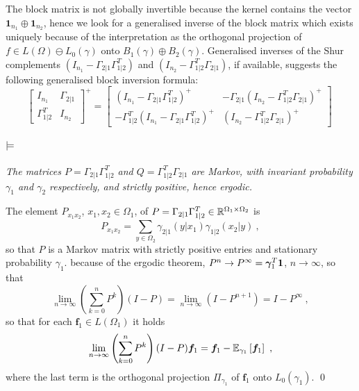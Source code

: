 \documentclass[runningheads]{llncs}
\begin{document}
The block matrix is not globally invertible because the kernel contains the vector $\bm 1 _{n_1} \oplus \bm 1_{n_2}$, hence we look for a generalised inverse of the block matrix  which  exists uniquely because of the interpretation as the orthogonal projection of $f \in L(\Omega) \ominus L_0(\gamma)$ onto $B_1(\gamma)\oplus B_2(\gamma)$. Generalised inverses of the Shur complements $(I_{n_1}-\Gamma_{2|1}\Gamma_{1|2}^T)$ and $(I_{n_2}-\Gamma_{1|2}^T\Gamma_{2|1})$, if available, suggests the following generalised block inversion formula:
%
\begin{equation}
\label{eq:blocksolve}
\begin{bmatrix}
    I_{n_1} & \Gamma_{2|1} \\ \Gamma_{1|2}^T & I_{n_2}
  \end{bmatrix} ^+ =
  \begin{bmatrix}
    (I_{n_1}-\Gamma_{2|1}\Gamma_{1|2}^T)^{+} & - \Gamma_{2|1} (I_{n_2}-\Gamma_{1|2}^T\Gamma_{2|1})^{+} \\
 - \Gamma_{1|2}^T (I_{n_1}-\Gamma_{2|1}\Gamma_{1|2}^T)^{+} & (I_{n_2}-\Gamma_{1|2}^T\Gamma_{2|1})^{+} 
\end{bmatrix} \ 
\end{equation}

\paragraph{$\bf\models$} \emph{The matrices $P = \Gamma_{2|1}\Gamma_{1|2}^T$ and $Q = \Gamma_{1|2}^T\Gamma_{2|1}$ are Markov, with invariant probability $\gamma_1$ and $\gamma_2$ respectively, and strictly positive, hence ergodic.}

The element $P_{x_1x_2}$, $x_1,x_2 \in \Omega_1$, of $P = \Gamma_{2|1}\Gamma_{1|2}^T \in \mathbb R^{\Omega_1 \times \Omega_2}$ is
%
\begin{equation*}
  P_{x_1x_2} = \sum_{y \in \Omega_2} \gamma_{2|1}(y|x_1) \gamma_{1|2}(x_2|y) \ ,
\end{equation*}
%
so that $P$ is a Markov matrix with strictly positive entries and stationary probability $\gamma_1$. because of the ergodic theorem, $P^n \to P^\infty = {\bm \gamma}_1^T \bm 1$, $n \to \infty$, so that 
%
\begin{equation*}
\lim_{n\to\infty} \left(\sum_{k=0}^n P^k\right)(I-P) = \lim_{n\to\infty} \left(I - P^{n+1}\right) = I - P^\infty \ , 
\end{equation*}
%
so that for each $\bm f_1 \in L(\Omega_1)$ it holds
%
\begin{equation*}
  \lim_{n\to\infty} \left(\sum_{k=0}^n P^k\right)(I-P) \bm f_1 = \bm f_1 - {\operatorname{\mathbb E}}_{\gamma_1}\left[\bm f_1\right] \ ,
\end{equation*}
%
where the last term is the orthogonal projection $\Pi_{\gamma_1}$ of $\bm f_1$ onto $L_0(\gamma_1)$. \qed
\end{document}
